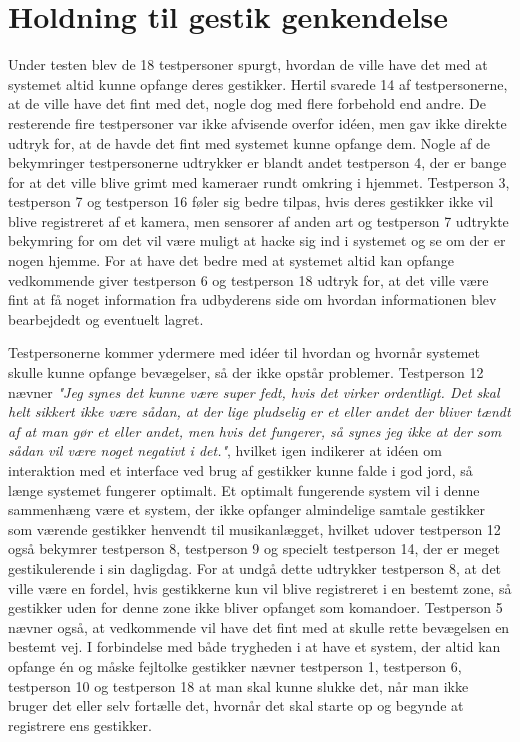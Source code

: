 \section{Holdning til gestik genkendelse}
\label{TestresultaterOvervaagning}
%
Under testen blev de 18 testpersoner spurgt, hvordan de ville have det med at systemet altid kunne opfange deres gestikker. Hertil svarede 14 af testpersonerne, at de ville have det fint med det, nogle dog med flere forbehold end andre. De resterende fire testpersoner var ikke afvisende overfor idéen, men gav ikke direkte udtryk for, at de havde det fint med systemet kunne opfange dem. Nogle af de bekymringer testpersonerne udtrykker er blandt andet testperson 4, der er bange for at det ville blive grimt med kameraer rundt omkring i hjemmet. Testperson 3, testperson 7 og testperson 16 føler sig bedre tilpas, hvis deres gestikker ikke vil blive registreret af et kamera, men sensorer af anden art og testperson 7 udtrykte bekymring for om det vil være muligt at hacke sig ind i systemet og se om der er nogen hjemme. For at have det bedre med at systemet altid kan opfange vedkommende giver testperson 6 og testperson 18 udtryk for, at det ville være fint at få noget information fra udbyderens side om hvordan informationen blev bearbejdedt og eventuelt lagret. 

Testpersonerne kommer ydermere med idéer til hvordan og hvornår systemet skulle kunne opfange bevægelser, så der ikke opstår problemer. Testperson 12 nævner \textsl{"Jeg synes det kunne være super fedt, hvis det virker ordentligt. Det skal helt sikkert ikke være sådan, at der lige pludselig er et eller andet der bliver tændt af at man gør et eller andet, men hvis det fungerer, så synes jeg ikke at der som sådan vil være noget negativt i det."}, hvilket igen indikerer at idéen om interaktion med et interface ved brug af gestikker kunne falde i god jord, så længe systemet fungerer optimalt. Et optimalt fungerende system vil i denne sammenhæng være et system, der ikke opfanger almindelige samtale gestikker som værende gestikker henvendt til musikanlægget, hvilket udover testperson 12 også bekymrer testperson 8, testperson 9 og specielt testperson 14, der er meget gestikulerende i sin dagligdag. For at undgå dette udtrykker testperson 8, at det ville være en fordel, hvis gestikkerne kun vil blive registreret i en bestemt zone, så gestikker uden for denne zone ikke bliver opfanget som komandoer. Testperson 5 nævner også, at vedkommende vil have det fint med at skulle rette bevægelsen en bestemt vej. I forbindelse med både trygheden i at have et system, der altid kan opfange én og måske fejltolke gestikker nævner testperson 1, testperson 6, testperson 10 og testperson 18 at man skal kunne slukke det, når man ikke bruger det eller selv fortælle det, hvornår det skal starte op og begynde at registrere ens gestikker. \blankline

